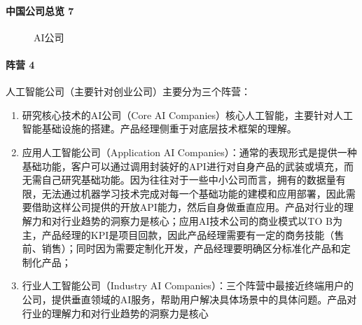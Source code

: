 \documentclass[letterpaper,11pt,english]{sphinxmanual}
\begin{document}
\paragraph{中国公司总览 7\sphinxfootnotemark[228]}
\label{\detokenize{chapter_project/AI_company:id3}}%
\begin{footnotetext}[228]\sphinxAtStartFootnote
{}
%
\end{footnotetext}\ignorespaces 
\begin{figure}[H]
\centering
\capstart

\noindent{}
\caption{AI公司}\label{\detokenize{chapter_project/AI_company:id6}}\end{figure}


\paragraph{阵营 4\sphinxfootnotemark[229]}
\label{\detokenize{chapter_project/AI_company:id4}}%
\begin{footnotetext}[229]\sphinxAtStartFootnote
{}
%
\end{footnotetext}\ignorespaces 
人工智能公司（主要针对创业公司）主要分为三个阵营：%
\begin{footnote}[230]\sphinxAtStartFootnote
{}
%
\end{footnote}
\begin{enumerate}
%
\item {} 
研究核心技术的AI公司（Core AI
Companies）核心人工智能，主要针对人工智能基础设施的搭建。产品经理侧重于对底层技术框架的理解。

\item {} 
应用人工智能公司（Application AI
Companies）：通常的表现形式是提供一种基础功能，客户可以通过调用封装好的API进行对自身产品的武装或填充，而无需自己研究基础功能。因为往往对于一些中小公司而言，拥有的数据量有限，无法通过机器学习技术完成对每一个基础功能的建模和应用部署，因此需要借助这样公司提供的开放API能力，然后自身做垂直应用。产品对行业的理解力和对行业趋势的洞察力是核心；应用AI技术公司的商业模式以TO
B为主，产品经理的KPI是项目回款，因此产品经理需要有一定的商务技能（售前、销售）；同时因为需要定制化开发，产品经理要明确区分标准化产品和定制化产品；

\item {} 
行业人工智能公司（Industry AI
Companies）：三个阵营中最接近终端用户的公司，提供垂直领域的AI服务，帮助用户解决具体场景中的具体问题。产品对行业的理解力和对行业趋势的洞察力是核心

\end{enumerate}
\end{document}
